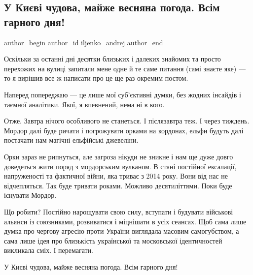  
 
 
 
 
 
\subsection{У Києві чудова, майже весняна погода. Всім гарного дня!}
\label{sec:15_02_2022.tg.iljenko_andrej.1.kiev_pogoda}
 
\ifcmt
 author_begin
   author_id iljenko_andrej
 author_end
\fi

Оскільки за останні дні десятки близьких і далеких знайомих та просто перехожих
на вулиці запитали мене одне й те саме питання (самі знаєте яке) — то я вирішив
все ж написати про це ще раз окремим постом. 

Наперед попереджаю — це лише мої суб’єктивні думки, без жодних інсайдів і
таємної аналітики. Якої, я впевнений, нема ні в кого. 

Отже. Завтра нічого особливого не станеться. І післязавтра теж. І через
тиждень. Мордор далі буде ричати і погрожувати орками на кордонах, ельфи будуть
далі постачати нам магічні ельфійські джевеліни. 

Орки зараз не рипнуться, але загроза нікуди не зникне і нам ще дуже довго
доведеться жити поряд з мордорським вулканом. В стані постійної ексалації,
напруженості та фактичної війни, яка триває з 2014 року. Вони від нас не
відчепляться. Так буде тривати роками. Можливо десятиліттями. Поки буде
існувати Мордор.

Що робити?  Постійно нарощувати свою силу, вступати і будувати військові
альянси із союзниками, розвиватися і міцнішати в усіх сеансах. Щоб сама лише
думка про чергову агресію проти України виглядала масовим самогубством, а сама
лише ідея про близькість української та московської ідентичностей викликала
сміх. І перемагати. 

У Києві чудова, майже весняна погода. Всім гарного дня!
